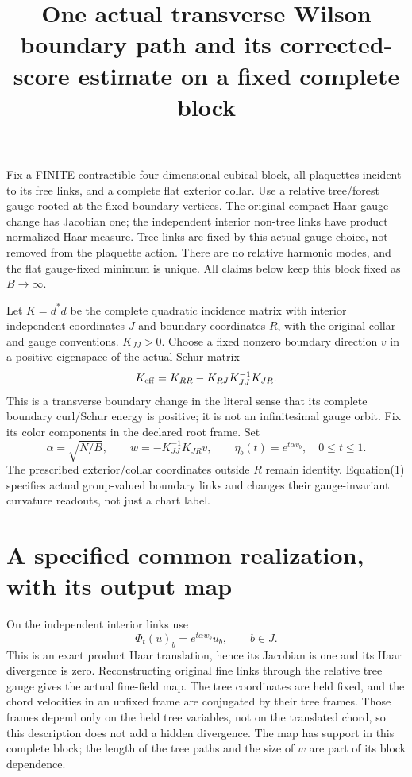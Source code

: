 \documentclass{article}
\title{One actual transverse Wilson boundary path and its corrected-score estimate on a fixed complete block}\author{}\date{}
\begin{document}
\maketitle
Fix a FINITE contractible four-dimensional cubical block, all plaquettes incident to its free links, and a complete flat exterior collar. Use a relative tree/forest gauge rooted at the fixed boundary vertices. The original compact Haar gauge change has Jacobian one; the independent interior non-tree links have product normalized Haar measure. Tree links are fixed by this actual gauge choice, not removed from the plaquette action. There are no relative harmonic modes, and the flat gauge-fixed minimum is unique. All claims below keep this block fixed as $B\to\infty$.

Let $K=d^*d$ be the complete quadratic incidence matrix with interior independent coordinates $J$ and boundary coordinates $R$, with the original collar and gauge conventions. $K_{JJ}>0$. Choose a fixed nonzero boundary direction $v$ in a positive eigenspace of the actual Schur matrix
\[
 K_{\rm eff}=K_{RR}-K_{RJ}K_{JJ}^{-1}K_{JR}.
\]
This is a transverse boundary change in the literal sense that its complete boundary curl/Schur energy is positive; it is not an infinitesimal gauge orbit. Fix its color components in the declared root frame. Set
\[
 \alpha=\sqrt{N/B},\qquad w=-K_{JJ}^{-1}K_{JR}v,\qquad
 \eta_b(t)=e^{t\alpha v_b},\quad 0\le t\le1.           \tag{1}
\]
The prescribed exterior/collar coordinates outside $R$ remain identity. Equation(1) specifies actual group-valued boundary links and changes their gauge-invariant curvature readouts, not just a chart label.

\section*{A specified common realization, with its output map}
On the independent interior links use
\[
 \Phi_t(u)_b=e^{t\alpha w_b}u_b,\qquad b\in J.          \tag{2}
\]
This is an exact product Haar translation, hence its Jacobian is one and its Haar divergence is zero. Reconstructing original fine links through the relative tree gauge gives the actual fine-field map. The tree coordinates are held fixed, and the chord velocities in an unfixed frame are conjugated by their tree frames. Those frames depend only on the held tree variables, not on the translated chord, so this description does not add a hidden divergence. The map has support in this complete block; the length of the tree paths and the size of $w$ are part of its block dependence.
\end{document}
